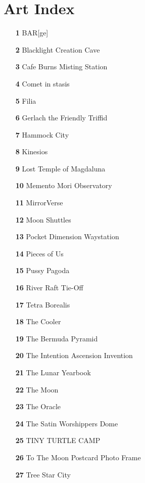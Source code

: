 \section*{Art Index}
\begin{itemize}[itemsep=.0125mm,parsep=2pt]
	\item[\textbf{ 1 }] BAR[ge]
	\item[\textbf{ 2 }] Blacklight Creation Cave
	\item[\textbf{ 3 }] Cafe Burns Misting Station
	\item[\textbf{ 4 }] Comet in stasis
	\item[\textbf{ 5 }] Filia
	\item[\textbf{ 6 }] Gerlach the Friendly Triffid
	\item[\textbf{ 7 }] Hammock City
	\item[\textbf{ 8 }] Kinesios
	\item[\textbf{ 9 }] Lost Temple of Magdaluna
	\item[\textbf{ 10 }] Memento Mori Observatory
	\item[\textbf{ 11 }] MirrorVerse
	\item[\textbf{ 12 }] Moon Shuttles
	\item[\textbf{ 13 }] Pocket Dimension Waystation
	\item[\textbf{ 14 }] Pieces of Us
	\item[\textbf{ 15 }] Pussy Pagoda
	\item[\textbf{ 16 }] River Raft Tie-Off
	\item[\textbf{ 17 }] Tetra Borealis
	\item[\textbf{ 18 }] The Cooler
	\item[\textbf{ 19 }] The Bermuda Pyramid
	\item[\textbf{ 20 }] The Intention Ascension Invention
	\item[\textbf{ 21 }] The Lunar Yearbook
	\item[\textbf{ 22 }] The Moon
	\item[\textbf{ 23 }] The Oracle
	\item[\textbf{ 24 }] The Satin Worshippers Dome
	\item[\textbf{ 25 }] TINY TURTLE CAMP
	\item[\textbf{ 26 }] To The Moon Postcard Photo Frame
	\item[\textbf{ 27 }] Tree Star City

\end{itemize}

